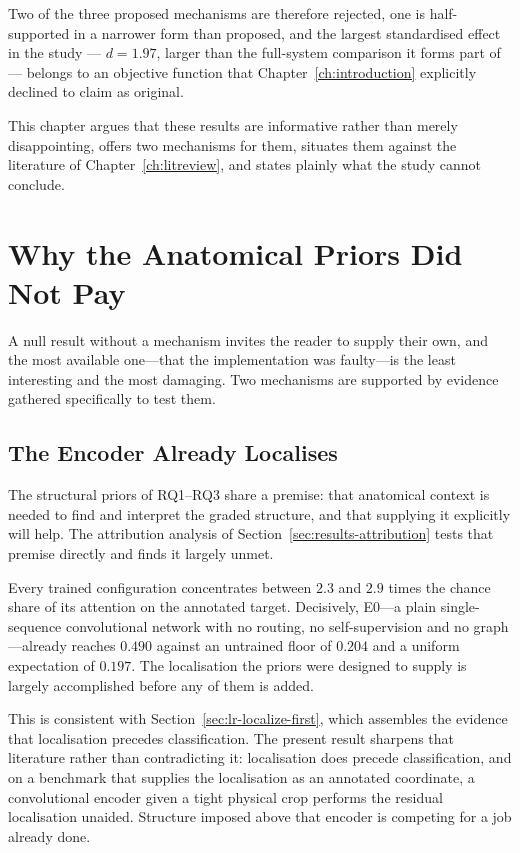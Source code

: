 \documentclass[12pt,a4paper]{report}
\begin{document}
Two of the three proposed mechanisms are therefore rejected, one is
half-supported in a narrower form than proposed, and the largest standardised
effect in the study --- $d = 1.97$, larger than the full-system comparison it
forms part of --- belongs to an objective function that
Chapter~\ref{ch:introduction} explicitly declined to claim as original.

This chapter argues that these results are informative rather than merely
disappointing, offers two mechanisms for them, situates them against the
literature of Chapter~\ref{ch:litreview}, and states plainly what the study
cannot conclude.

\section{Why the Anatomical Priors Did Not Pay}
\label{sec:disc-why}

A null result without a mechanism invites the reader to supply their own, and
the most available one---that the implementation was faulty---is the least
interesting and the most damaging. Two mechanisms are supported by evidence
gathered specifically to test them.

\subsection{The Encoder Already Localises}
\label{sec:disc-localise}

The structural priors of RQ1--RQ3 share a premise: that anatomical context is
needed to find and interpret the graded structure, and that supplying it
explicitly will help. The attribution analysis of
Section~\ref{sec:results-attribution} tests that premise directly and finds it
largely unmet.

Every trained configuration concentrates between $2.3$ and $2.9$ times the
chance share of its attention on the annotated target. Decisively, E0---a plain
single-sequence convolutional network with no routing, no self-supervision and
no graph---already reaches $0.490$ against an untrained floor of $0.204$ and a
uniform expectation of $0.197$. The localisation the priors were designed to
supply is largely accomplished before any of them is added.

This is consistent with Section~\ref{sec:lr-localize-first}, which
assembles the evidence that localisation precedes classification. The present
result sharpens that literature rather than contradicting it: localisation does
precede classification, and on a benchmark that supplies the localisation as an
annotated coordinate, a convolutional encoder given a tight physical crop
performs the residual localisation unaided. Structure imposed above that
encoder is competing for a job already done.
\end{document}

